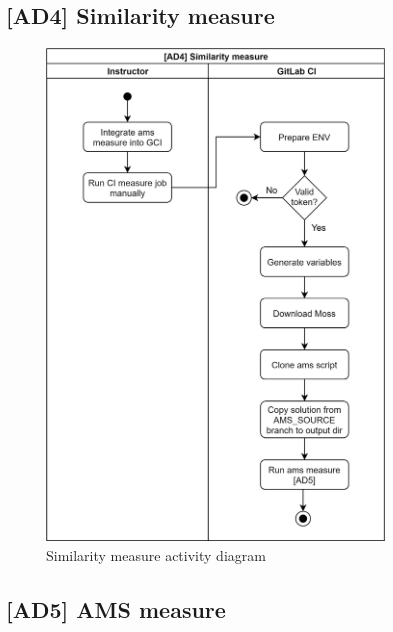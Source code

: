 \subsection{{[}AD4{]} Similarity measure} \label{ssec:ad4}

\begin{figure}[H]
    \centering
    \includegraphics[width=0.8\textwidth,height=\textheight,keepaspectratio]{Figures/ad/ad11.png}
    \caption{Similarity measure activity diagram}
\end{figure}

\subsection{{[}AD5{]} AMS measure} \label{ssec:ad5}

